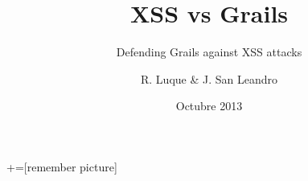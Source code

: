 \documentclass{beamer}
\title{XSS vs Grails}
\subtitle{Defending Grails against XSS attacks}
\author{R. Luque \& J. San Leandro}
\institute{%
  \href{http://twitter.com/rafael_luque}{@rafael\_luque} - \href{http://osoco.es}{Osoco}
  \hskip20pt
  \href{http://twitter.com/rydnr}{@rydnr} - \href{http://www.ventura24.es}{Ventura24}
}
\date[10/2013]{Octubre 2013}
\begin{document}
+=[remember picture]













\end{document}
